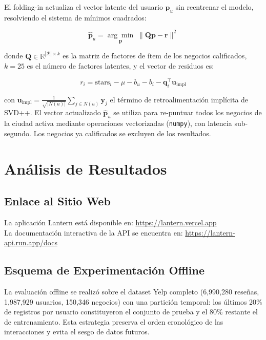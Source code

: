 \documentclass[11pt,a4paper]{article}
\begin{document}
El folding-in actualiza el vector latente del usuario $\mathbf{p}_u$ sin reentrenar el modelo, resolviendo el sistema de mínimos cuadrados:

\begin{equation}
    \hat{\mathbf{p}}_u = \underset{\mathbf{p}}{\arg\min}\; \| \mathbf{Q} \mathbf{p} - \mathbf{r} \|^2
\end{equation}

donde $\mathbf{Q} \in \mathbb{R}^{|\mathcal{R}| \times k}$ es la matriz de factores de ítem de los negocios calificados, $k=25$ es el número de factores latentes, y el vector de residuos es:

\begin{equation}
    r_i = \text{stars}_i - \mu - b_u - b_i - \mathbf{q}_i^\top \mathbf{u}_{\text{impl}}
\end{equation}

con $\mathbf{u}_{\text{impl}} = \frac{1}{\sqrt{|N(u)|}} \sum_{j \in N(u)} \mathbf{y}_j$ el término de retroalimentación implícita de SVD++. El vector actualizado $\hat{\mathbf{p}}_u$ se utiliza para re-puntuar todos los negocios de la ciudad activa mediante operaciones vectorizadas (\texttt{numpy}), con latencia sub-segundo. Los negocios ya calificados se excluyen de los resultados.


\section{Análisis de Resultados}

\subsection{Enlace al Sitio Web}

La aplicación Lantern está disponible en: \url{https://lantern.vercel.app} \\
La documentación interactiva de la API se encuentra en: \url{https://lantern-api.run.app/docs}

\subsection{Esquema de Experimentación Offline}

La evaluación offline se realizó sobre el dataset Yelp completo (6,990,280 reseñas, 1,987,929 usuarios, 150,346 negocios) con una partición temporal: los últimos 20\% de registros por usuario constituyeron el conjunto de prueba y el 80\% restante el de entrenamiento. Esta estrategia preserva el orden cronológico de las interacciones y evita el sesgo de datos futuros.
\end{document}
